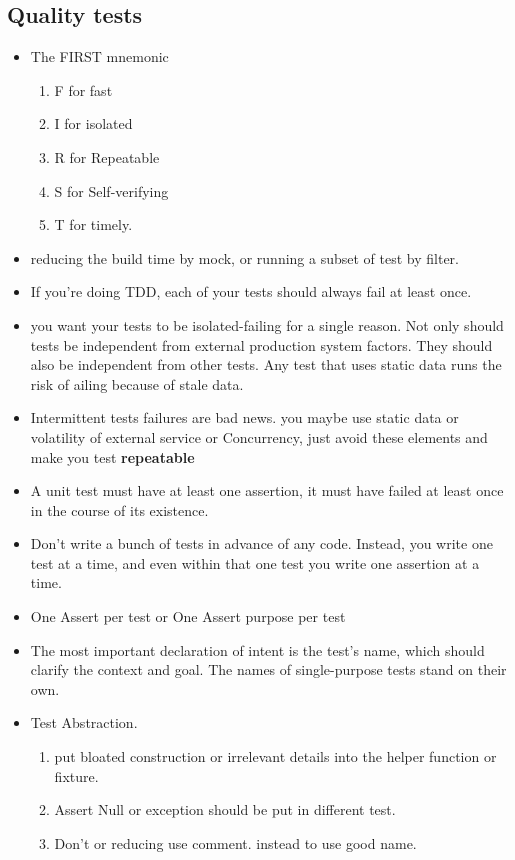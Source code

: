 \documentclass[a4paper,11pt,twoside]{book}
\begin{document}
\subsection{Quality tests}
\begin{itemize}
	\item The FIRST mnemonic 
	\begin{enumerate}
		\item F for fast
		\item I for isolated
		\item R for Repeatable
		\item S for Self-verifying
		\item T for timely.
	\end{enumerate}
	\item reducing the build time by mock, or running a subset of test by filter. 
	
	\item If you're doing TDD, each of your tests should always fail at least once. 
	
	\item you want your tests to be isolated-failing for a single reason. Not only should tests be independent from external production system factors. They should also be independent from other tests. Any test that uses static data runs the risk of ailing because of stale data. 
	
	\item Intermittent tests failures are bad news. you maybe use static data or volatility of external service or Concurrency, just avoid these elements and make you test \textbf{repeatable}
	
	\item A unit test must have at least one assertion, it must have failed at least once in the course of its existence. 
	
	\item Don't write a bunch of tests in advance of any code. Instead, you write one test at a time, and even within that one test you write one assertion at a time. 
	
	\item One Assert per test or One Assert purpose per test 	\item The most important declaration of intent is the test's name, which should clarify the context and goal. The names of single-purpose tests stand on their own. 

	\item Test Abstraction.
\begin{enumerate}
	\item put bloated construction or irrelevant details into the helper function or fixture. 
	\item Assert Null or exception should be put in different test.
	\item Don't or reducing use comment. instead to use good name. 
\end{enumerate}

\end{itemize}
\end{document}
